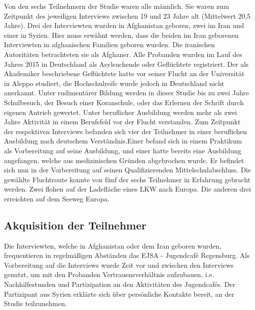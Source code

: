 Von den sechs Teilnehmern der Studie waren alle männlich. Sie waren zum Zeitpunkt des jeweiligen Interviews zwischen 19 und 23 Jahre alt (Mittelwert 20,5 Jahre). Drei der Interviewten wurden in Afghanistan geboren, zwei im Iran und einer in Syrien. \newline 
Hier muss erwähnt werden, dass die beiden im Iran geborenen Interviewten in afghanischen Familien geboren wurden. Die iranischen Autoritäten betrachteten sie als Afghaner.\newline
Alle Probanden wurden im Lauf des Jahres 2015 in Deutschland als Asylsuchende oder Geflüchtete registriert. Der als Akademiker beschriebene Geflüchtete hatte vor seiner Flucht an der Universität in Aleppo studiert, die Hochschulreife wurde jedoch in Deutschland nicht anerkannt.\newline
Unter rudimentärer Bildung werden in dieser Studie bis zu zwei Jahre Schulbesuch, der Besuch einer Koranschule, oder das Erlernen der Schrift durch eigenen Antrieb gewertet.\newline
Unter beruflicher Ausbildung werden mehr als zwei Jahre Aktivität in einem Berufsfeld vor der Flucht verstanden.\newline
Zum Zeitpunkt der respektiven Interviews befanden sich vier der Teilnehmer in einer beruflichen Ausbildung nach deutschem Verständnis.\newline Einer befand sich in einem Praktikum als Vorbereitung auf seine Ausbildung, und einer hatte bereits eine Ausbildung angefangen, welche aus medizinischen Gründen abgebrochen wurde. Er befindet sich nun in der Vorbereitung auf seinen Qualifizierenden Mittelschulabschluss.\newline
Die gewählte Fluchtroute konnte von fünf der sechs Teilnehmer in Erfahrung gebracht werden. Zwei flohen auf der Ladefläche eines LKW nach Europa. Die anderen drei erreichten auf dem Seeweg Europa.

\subsection{Akquisition der Teilnehmer}
Die Interviewten, welche in Afghanistan oder dem Iran geboren wurden, frequentieren in regelmäßigen Abständen das EJSA - Jugendcafé Regensburg. Als Vorbereitung auf die Interviews wurde Zeit vor und zwischen den Interviews genutzt, um mit den Probanden Vertrauensverhältnis aufzubauen, i.e. Nachhilfestunden und Partizipation an den Aktivitäten des Jugendcafés.\newline
Der Partizipant aus Syrien erklärte sich über persönliche Kontakte bereit, an der Studie teilzunehmen.

